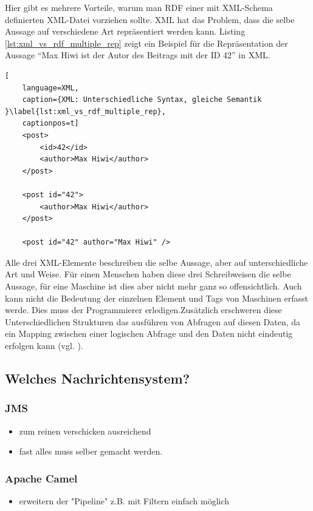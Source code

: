 Hier gibt es mehrere Vorteile, warum man RDF einer mit XML-Schema definierten XML-Datei vorziehen sollte. XML hat das Problem, dass die selbe Aussage auf verschiedene Art repräsentiert werden kann. Listing \ref{lst:xml_vs_rdf_multiple_rep} zeigt ein Beispiel für die Repräsentation der Aussage \enquote{Max Hiwi ist der Autor des Beitrags mit der ID 42} in XML.

\begin{lstlisting}[
    language=XML,
    caption={XML: Unterschiedliche Syntax, gleiche Semantik }\label{lst:xml_vs_rdf_multiple_rep},
    captionpos=t]
    <post>
        <id>42</id>
        <author>Max Hiwi</author>
    </post>

    <post id="42">
        <author>Max Hiwi</author>
    </post>

    <post id="42" author="Max Hiwi" />
\end{lstlisting}

Alle drei XML-Elemente beschreiben die selbe Aussage, aber auf unterschiedliche Art und Weise. Für einen Menschen haben diese drei Schreibweisen die selbe Aussage, für eine Maschine ist dies aber nicht mehr ganz so offensichtlich. Auch kann nicht die Bedeutung der einzelnen Element und Tags von Maschinen erfasst werde. Dies muss der Programmierer erledigen.Zusätzlich erschweren diese Unterschiedlichen Strukturen das ausführen von Abfragen auf diesen Daten, da ein Mapping zwischen einer logischen Abfrage und den Daten nicht eindeutig erfolgen kann (vgl. \cite[s.\,41]{Schroder2003a}).


\subsection{Welches Nachrichtensystem?} %
\label{sub:welches_nachrichtensystem}

\subsubsection{JMS} %
\label{ssub:analyse_jms}
\begin{itemize}
    \item zum reinen verschicken ausreichend
    \item fast alles muss selber gemacht werden.
\end{itemize}
    
\subsubsection{Apache Camel} %
\label{ssub:analyse_apache_camel}
    \begin{itemize}
        \item erweitern der "Pipeline" z.B. mit Filtern einfach möglich
    \end{itemize}

